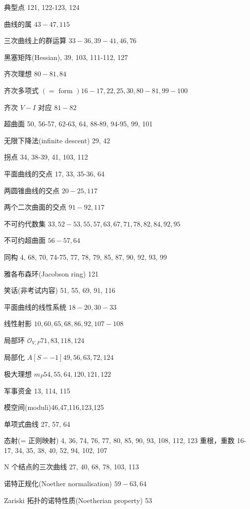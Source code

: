 典型点 121, 122-123, 124

曲线的属 \({43} - {47},{115}\)

三次曲线上的群运算 \({33} - {36},{39} - {41},{46},{76}\)

黑塞矩阵(Hessian), 39, 103, 111-112, 127

齐次理想 \({80} - {81},{84}\)

齐次多项式 \(\left( { = \text{ form }}\right) {16} - {17},{22},{25},{30},{80} - {81},{99} - {100}\)

齐次 \(V - I\) 对应 \({81} - {82}\)

超曲面 50, 56-57, 62-63, 64, 88-89, 94-95, 99, 101

无限下降法(infinite descent) 29, 42

拐点 34, 38-39, 41, 103, 112

平面曲线的交点 17, 33, 35-36, 64

两圆锥曲线的交点 \({20} - {25},{117}\)

两个二次曲面的交点 \({91} - {92},{117}\)

不可约代数集 \({33},{52} - {53},{55},{57},{63},{67},{71},{78},{82},{84},{92},{95}\)

不可约超曲面 \({56} - {57},{64}\)

同构 4, 68, 70, 74-75, 77, 78, 79, 85, 87, 90, 92, 93, 99

雅各布森环(Jacobson ring) 121

笑话(非考试内容) 51, 55, 69, 91, 116

平面曲线的线性系统 \({18} - {20},{30} - {33}\)

线性射影 \({10},{60},{65},{68},{86},{92},{107} - {108}\)

局部环 \({\mathcal{O}}_{V,P}{71},{83},{118},{124}\)

局部化 \(A\left\lbrack  {S -  - 1}\right\rbrack  {49},{56},{63},{72},{124}\)

极大理想 \({m}_{P}{54},{55},{64},{120},{121},{122}\)

军事资金 13, 114, 115

模空间(moduli)46,47,116,123,125

单项式曲线 27, 57, 64

态射(= 正则映射) 4, 36, 74, 76, 77, 80, 85, 90, 93, 108, 112, 123 重根，重数 16-17, 34, 35, 38, 40, 52, 94, 102, 107

N 个结点的三次曲线 27, 40, 68, 78, 103, 113

诺特正规化(Noether normalisation) \({59} - {63},{64}\)

Zariski 拓扑的诺特性质(Noetherian property) 53

